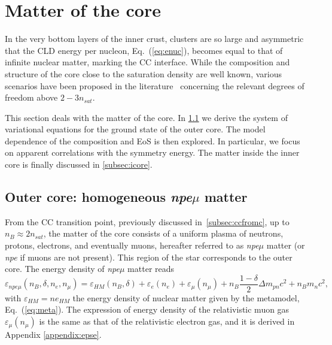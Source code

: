 
\section{Matter of the core}\label{sec:core}

In the very bottom layers of the inner crust, clusters are so large and
asymmetric that the CLD energy per nucleon, Eq.~(\ref{eq:enuc}), becomes equal to 
that of infinite nuclear matter, marking the CC interface. While the
composition and structure of the core close to the saturation density are well
known, various scenarios have been proposed in the
literature~\cite{Oertel2017} concerning the relevant degrees of freedom 
above $2-3n_{sat}$. 

This section deals with the matter of the core. In \ref{subsec:ocore} we derive
the system of variational equations for the ground state of the outer core. The
model dependence of the composition and EoS is then explored. In particular, we
focus on apparent correlations with the symmetry energy. The matter inside the 
inner core is finally discussed in \ref{subsec:icore}.

\subsection{Outer core: homogeneous \textit{npe$\mu$}
matter}\label{subsec:ocore}

From the CC transition point, previously discussed in~\ref{subsec:ccfromc}, up to 
$n_B \approx 2n_{sat}$, the matter of the core consists of a uniform plasma of 
neutrons, protons, electrons, and eventually muons, hereafter referred to 
as \textit{npe$\mu$} matter (or \textit{npe} if muons are not
present). This region of the star corresponds to the outer core.
The energy density of \textit{npe$\mu$} matter reads
%
\begin{equation}
  \varepsilon_{npe\mu}(n_B,\delta,n_e,n_{\mu}) = \varepsilon_{HM}(n_B,\delta) +
  \varepsilon_{e}(n_e) + \varepsilon_{\mu}(n_{\mu}) + n_B\frac{1-\delta}{2}\Delta
  m_{pn}c^2 + n_B m_n c^2,\label{eq:epscore}
\end{equation}
%
with $\varepsilon_{HM} = ne_{HM}$ the energy density of nuclear matter 
given by the metamodel, Eq.~(\ref{eq:meta}). The expression of energy density
of the relativistic muon gas $\varepsilon_{\mu}(n_{\mu})$ is the same as that 
of the relativistic electron gas, and it is derived in Appendix \ref{appendix:epse}.

